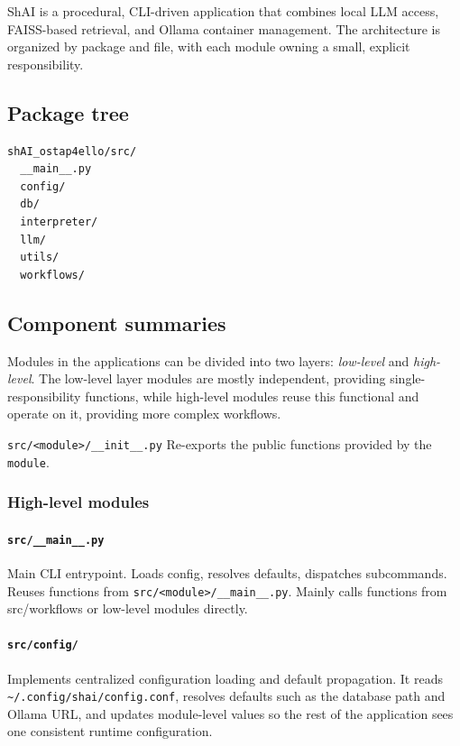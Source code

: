 ShAI is a procedural, CLI-driven application that combines local LLM access, FAISS-based retrieval,
and Ollama container management. The architecture is organized by package and file, with each module
owning a small, explicit responsibility.
\label{a-shai-architecture}

\subsection*{Package tree}

\begin{verbatim}
shAI_ostap4ello/src/
  __main__.py
  config/
  db/
  interpreter/
  llm/
  utils/
  workflows/
\end{verbatim}


\subsection*{Component summaries}

Modules in the applications can be divided into two layers: \textsl{low-level}
and \textsl{high-level}. The low-level layer modules are mostly independent,
providing single-responsibility functions, while high-level modules reuse this
functional and operate on it, providing more complex workflows.

\texttt{src/<module>/\_\_init\_\_.py} Re-exports the public functions provided
by the \texttt{module}.


\subsubsection*{High-level modules}

\paragraph{\texttt{src/\_\_main\_\_.py}}
Main CLI entrypoint. Loads config, resolves defaults, dispatches subcommands.
Reuses functions from \texttt{src/<module>/\_\_main\_\_.py}. Mainly calls functions from
src/workflows or low-level modules directly.

\paragraph{\texttt{src/config/}}
Implements centralized configuration loading and default propagation. It reads
\texttt{\textasciitilde/.config/shai/config.conf}, resolves defaults such as the database path and
Ollama URL, and updates module-level values so the rest of the application sees one consistent
runtime configuration.

